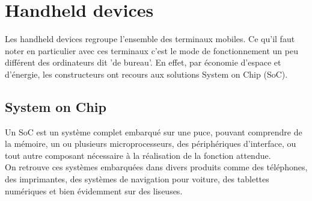 \section{Handheld devices}
Les handheld devices regroupe l'ensemble des terminaux mobiles. Ce qu'il faut noter en particulier avec ces terminaux c'est le mode de fonctionnement un peu différent des ordinateurs dit 'de bureau'. En effet, par économie d'espace et d'énergie, les constructeurs ont recours aux solutions System on Chip (SoC).

\subsection{System on Chip}
Un SoC est un système complet embarqué sur une puce, pouvant comprendre de la mémoire, un ou plusieurs microprocesseurs, des périphériques d'interface, ou tout autre composant nécessaire à la réalisation de la fonction attendue.
\\On retrouve ces systèmes embarquées dans divers produits comme des téléphones, des imprimantes, des systèmes de navigation pour voiture, des tablettes numériques et bien évidemment sur des liseuses.